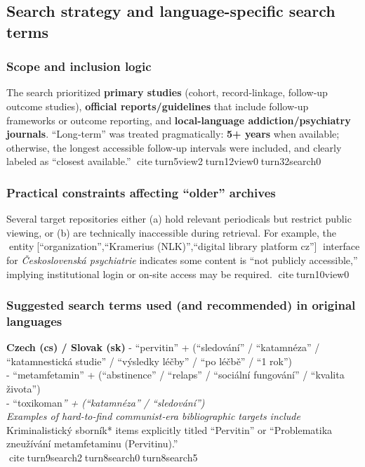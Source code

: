 \subsection{Search strategy and language-specific search terms}\label{13_non_english-search-strategy-and-language-specific-search-terms}

\subsubsection{Scope and inclusion logic}\label{13_non_english-scope-and-inclusion-logic}

The search prioritized \textbf{primary studies} (cohort, record‑linkage, follow‑up outcome studies), \textbf{official reports/guidelines} that include follow‑up frameworks or outcome reporting, and \textbf{local-language addiction/psychiatry journals}. ``Long‑term'' was treated pragmatically: \textbf{5+ years} when available; otherwise, the longest accessible follow‑up intervals were included, and clearly labeled as ``closest available.'' citeturn5view2turn12view0turn32search0

\subsubsection{Practical constraints affecting ``older'' archives}\label{13_non_english-practical-constraints-affecting-older-archives}

Several target repositories either (a) hold relevant periodicals but restrict public viewing, or (b) are technically inaccessible during retrieval. For example, the entity{[}``organization'',``Kramerius (NLK)'',``digital library platform cz''{]} interface for \emph{Československá psychiatrie} indicates some content is ``not publicly accessible,'' implying institutional login or on‑site access may be required. citeturn10view0

\subsubsection{Suggested search terms used (and recommended) in original languages}\label{13_non_english-suggested-search-terms-used-and-recommended-in-original-languages}

\textbf{Czech (cs) / Slovak (sk)} - ``pervitin'' + (``sledování'' / ``katamnéza'' / ``katamnestická studie'' / ``výsledky léčby'' / ``po léčbě'' / ``1 rok'')\\
- ``metamfetamin'' + (``abstinence'' / ``relaps'' / ``sociální fungování'' / ``kvalita života'')\\
- ``toxikoman\emph{'' + (``katamnéza'' / ``sledování'')\\
Examples of hard-to-find communist‑era bibliographic targets include }Kriminalistický sborník* items explicitly titled ``Pervitin'' or ``Problematika zneužívání metamfetaminu (Pervitinu).'' citeturn9search2turn8search0turn8search5


